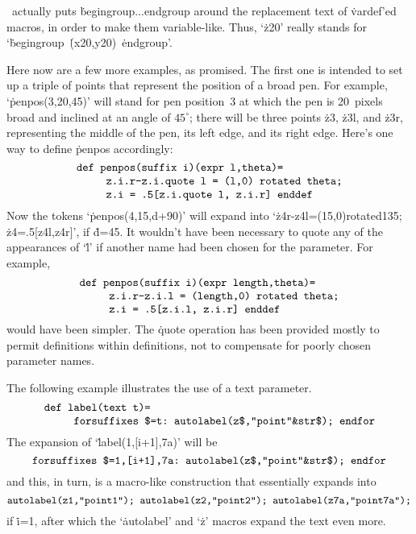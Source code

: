 \MF\ actually puts \.{begingroup...endgroup} around the replacement text of
\.{vardef}'ed macros, in order to make them variable-like.
Thus, `\.{z20}' really stands for `\.{begingroup}~\.{(x20,y20)}~\.{endgroup}'.

Here now are a few more examples, as promised. The first one
is intended to set up a triple of points that represent the position
of a broad pen. For example, `\.{penpos(3,20,45)}' will stand for pen
position~3 at which the pen is 20~pixels broad and inclined at an
angle of $45^\circ$; there will be three points \.{z3}, \.{z3l}, and
\.{z3r}, representing the middle of the pen, its left edge, and its
right edge. Here's one way to define \.{penpos} accordingly:
$$\vcenter{\halign{\tt#\hfil\cr
def penpos(suffix i)(expr l,theta)=\cr
\ \ \ \ \ z.i.r-z.i.quote l = (l,0) rotated theta;\cr
\ \ \ \ \ z.i = .5[z.i.quote l, z.i.r] enddef\cr}}$$
Now the tokens `\.{penpos(4,15,d+90)}' will expand into
`\.{z4r-z4l=(15,0)rotated135;} \.{z4=.5[z4l,z4r]}', if \.{d=45}. It
wouldn't have been necessary to quote any of the appearances of `\.l' if
another name had been chosen for the parameter. For example,
$$\vcenter{\halign{\tt#\hfil\cr
def penpos(suffix i)(expr length,theta)=\cr
\ \ \ \ \ z.i.r-z.i.l = (length,0) rotated theta;\cr
\ \ \ \ \ z.i = .5[z.i.l, z.i.r] enddef\cr}}$$
would have been simpler. The \.{quote} operation has been provided
mostly to permit definitions within definitions, not to compensate for
poorly chosen parameter names.

The following example illustrates the use of a text parameter.
$$\vcenter{\halign{\tt#\hfil\cr
def label(text t)=\cr
\ \ \ \ \ forsuffixes \$=t:\ autolabel(z\$,"point"\&str\$); endfor\cr}}$$
The expansion of `\.{label(1,[i+1],7a)}' will be
$$\hbox{\tt forsuffixes \$=1,[i+1],7a:\
  autolabel(z\$,"point"\&str\$); endfor}$$
and this, in turn, is a macro-like construction that essentially expands into
$$\hbox{\tt autolabel(z1,"point1"); autolabel(z2,"point2");
  autolabel(z7a,"point7a");}$$
if \.{i=1}, after which the `\.{autolabel}' and `\.z' macros expand the
text even more.


